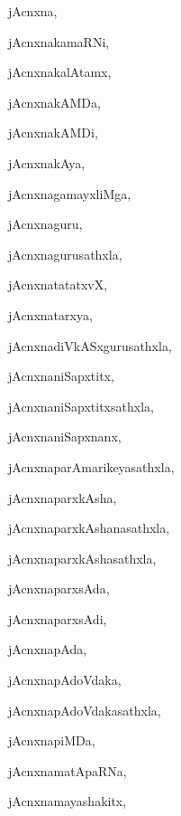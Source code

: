 \begin{multicols}{3}
{\noindent
{jAcnxna}, \pageref{jAcnxna}

\noindent
{jAcnxnakamaRNi}, \pageref{jAcnxnakamaRNi}

\noindent
{jAcnxnakalAtamx}, \pageref{jAcnxnakalAtamx}

\noindent
{jAcnxnakAMDa}, \pageref{jAcnxnakAMDa}

\noindent
{jAcnxnakAMDi}, \pageref{jAcnxnakAMDi}

\noindent
{jAcnxnakAya}, \pageref{jAcnxnakAya}

\noindent
{jAcnxnagamayxliMga}, \pageref{jAcnxnagamayxliMga}

\noindent
{jAcnxnaguru}, \pageref{jAcnxnaguru}

\noindent
{jAcnxnagurusathxla}, \pageref{jAcnxnagurusathxla}

\noindent
{jAcnxnatatatxvX}, \pageref{jAcnxnatatatxvX}

\noindent
{jAcnxnatarxya}, \pageref{jAcnxnatarxya}

\noindent
{jAcnxnadiVkASxgurusathxla}, \pageref{jAcnxnadiVkASxgurusathxla}

\noindent
{jAcnxnaniSapxtitx}, \pageref{jAcnxnaniSapxtitx}

\noindent
{jAcnxnaniSapxtitxsathxla}, \pageref{jAcnxnaniSapxtitxsathxla}

\noindent
{jAcnxnaniSapxnanx}, \pageref{jAcnxnaniSapxnanx}

\noindent
{jAcnxnaparAmarikeyasathxla}, \pageref{jAcnxnaparAmarikeyasathxla}

\noindent
{jAcnxnaparxkAsha}, \pageref{jAcnxnaparxkAsha}

\noindent
{jAcnxnaparxkAshanasathxla}, \pageref{jAcnxnaparxkAshanasathxla}

\noindent
{jAcnxnaparxkAshasathxla}, \pageref{jAcnxnaparxkAshasathxla}

\noindent
{jAcnxnaparxsAda}, \pageref{jAcnxnaparxsAda}

\noindent
{jAcnxnaparxsAdi}, \pageref{jAcnxnaparxsAdi}

\noindent
{jAcnxnapAda}, \pageref{jAcnxnapAda}

\noindent
{jAcnxnapAdoVdaka}, \pageref{jAcnxnapAdoVdaka}

\noindent
{jAcnxnapAdoVdakasathxla}, \pageref{jAcnxnapAdoVdakasathxla}

\noindent
{jAcnxnapiMDa}, \pageref{jAcnxnapiMDa}

\noindent
{jAcnxnamatApaRNa}, \pageref{jAcnxnamatApaRNa}

\noindent
{jAcnxnamayashakitx}, \pageref{jAcnxnamayashakitx}

}
\end{multicols}

